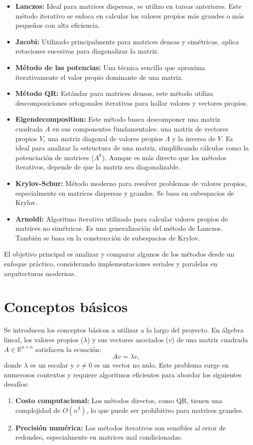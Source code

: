 \documentclass{article}
\begin{document}
\begin{itemize}
    \item \textbf{Lanczos:} Ideal para matrices dispersas, se utilizo en tareas anteriores. Este método iterativo se enfoca en calcular los valores propios más grandes o más pequeños con alta eficiencia.
    \item \textbf{Jacobi:} Utilizado principalmente para matrices densas y simétricas, aplica rotaciones sucesivas para diagonalizar la matriz.
    \item \textbf{Método de las potencias:} Una técnica sencilla que aproxima iterativamente el valor propio dominante de una matriz.
    \item \textbf{Método QR:} Estándar para matrices densas, este método utiliza descomposiciones ortogonales iterativas para hallar valores y vectores propios.
    \item \textbf{Eigendecomposition:}  Este método busca descomponer una matriz cuadrada \( A \) en sus componentes fundamentales: una matriz de vectores propios \( V \), una matriz diagonal de valores propios \( \Lambda \) y la inversa de \( V \). Es ideal para analizar la estructura de una matriz, simplificando cálculos como la potenciación de matrices (\( A^k \)). Aunque es más directo que los métodos iterativos, depende de que la matriz sea diagonalizable.
    \item \textbf{Krylov-Schur:} Método moderno para resolver problemas de valores propios, especialmente en matrices dispersas y grandes. Se basa en subespacios de Krylov.
    \item \textbf{Arnoldi:} Algoritmo iterativo utilizado para calcular valores propios de matrices no simétricas. Es una generalización del método de Lanczos. También se basa en la construcción de subespacios de Krylov.
\end{itemize}

El objetivo principal es analizar y comparar algunos de los métodos desde un enfoque práctico, considerando implementaciones seriales y paralelas en arquitecturas modernas.

\section{Conceptos básicos}
Se introducen los conceptos básicos a utilizar a lo largo del proyecto.
En álgebra lineal, los valores propios (\(\lambda\)) y sus vectores asociados (\(v\)) de una matriz cuadrada \(A \in \mathbb{R}^{n \times n}\) satisfacen la ecuación:
\[
A v = \lambda v,
\]
donde \(\lambda\) es un escalar y \(v \neq 0\) es un vector no nulo. Este problema surge en numerosos contextos y requiere algoritmos eficientes para abordar los siguientes desafíos:
\begin{enumerate}
    \item \textbf{Costo computacional:} Los métodos directos, como QR, tienen una complejidad de \(O(n^3)\), lo que puede ser prohibitivo para matrices grandes.
    \item \textbf{Precisión numérica:} Los métodos iterativos son sensibles al error de redondeo, especialmente en matrices mal condicionadas.
\end{enumerate}
\end{document}
